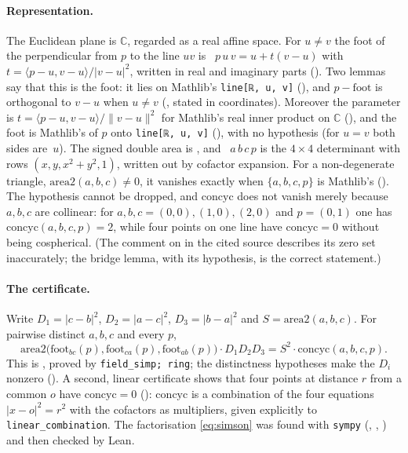 \documentclass[11pt]{article}
\theoremstyle{definition}
\theoremstyle{remark}
\newcommand{\lean}[1]{\texttt{#1}}
\newcommand{\CC}{\mathbb{C}}
\begin{document}
\paragraph{Representation.} The Euclidean plane is $\CC$, regarded as a real affine space. For
$u\ne v$ the foot of the perpendicular from $p$ to the line $uv$ is
~$p\,u\,v=u+t(v-u)$ with
$t=\langle p-u,v-u\rangle/|v-u|^2$, written in real and imaginary parts
(). Two lemmas say that this is the foot: it lies on Mathlib's
\lean{line[ℝ, u, v]} (), and $p-\mathrm{foot}$ is orthogonal to
$v-u$ when $u\ne v$ (, stated in coordinates). Moreover the parameter
is $t=\langle p-u,v-u\rangle/\|v-u\|^2$ for Mathlib's real inner product on $\CC$
(), and the foot is Mathlib's
 of $p$ onto \lean{line[ℝ, u, v]}
(), with no hypothesis (for $u=v$ both sides
are~$u$). The signed double area is
, and ~$a\,b\,c\,p$ is the $4\times4$ determinant with rows
$(x,y,x^2+y^2,1)$, written out by cofactor expansion. For a non-degenerate triangle,
$\mathrm{area2}(a,b,c)\ne0$, it vanishes exactly when $\{a,b,c,p\}$ is Mathlib's
 (). The
hypothesis cannot be dropped, and $\mathrm{concyc}$ does not vanish merely because $a,b,c$ are
collinear: for $a,b,c=(0,0),(1,0),(2,0)$ and $p=(0,1)$ one has $\mathrm{concyc}(a,b,c,p)=2$, while
four points on one line have $\mathrm{concyc}=0$ without being cospherical. (The comment on
 in the cited source describes its zero set inaccurately; the bridge lemma,
with its hypothesis, is the correct statement.)

\paragraph{The certificate.} Write $D_1=|c-b|^2$, $D_2=|a-c|^2$, $D_3=|b-a|^2$ and $S=\mathrm{area2}(a,b,c)$.
For pairwise distinct $a,b,c$ and every $p$,
\begin{equation}\label{eq:simson}
\mathrm{area2}\bigl(\mathrm{foot}_{bc}(p),\mathrm{foot}_{ca}(p),\mathrm{foot}_{ab}(p)\bigr)\cdot D_1D_2D_3
 = S^2\cdot\mathrm{concyc}(a,b,c,p).
\end{equation}
This is , proved by \lean{field\_simp; ring}; the distinctness
hypotheses make the $D_i$ nonzero (). A second, linear certificate shows
that four points at distance $r$ from a common $o$ have $\mathrm{concyc}=0$
(): $\mathrm{concyc}$ is a combination of the four equations
$|x-o|^2=r^2$ with the cofactors as multipliers, given explicitly to \lean{linear\_combination}.
The factorisation \eqref{eq:simson} was found with \texttt{sympy} (,
, ) and then checked by Lean.
\end{document}
